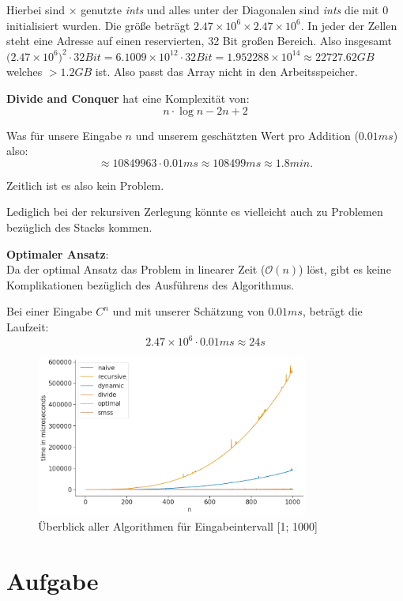 \documentclass[10pt]{article}
\begin{document}
    Hierbei sind $\times$ genutzte \textit{ints} und alles unter der Diagonalen sind \textit{ints} die mit 0 
    initialisiert wurden. Die grö\ss e beträgt $2.47 \times 10^{6} \times 2.47 \times 10^{6}$. In jeder der Zellen steht
    eine Adresse auf einen reservierten, 32 Bit gro\ss en Bereich.
    Also insgesamt $\big(2.47 \times 10^{6}\big)^{2} \cdot 32 Bit = 6.1009 \times 10^{12} \cdot 32 Bit = 1.952288 \times 10^{14} \approx 22727.62 GB$ 
    welches $> 1.2 GB$ ist. Also passt das Array nicht in den Arbeitsspeicher.
    

   \textbf{Divide and Conquer} hat eine Komplexität von:
   $$
        n \cdot \log n - 2 n + 2
   $$

   Was für unsere Eingabe $n$ und unserem geschätzten Wert pro Addition ($0.01ms$) also:
   \[
       \approx 10 849 963 \cdot 0.01ms \approx 108499ms \approx 1.8 min
   .\]

   Zeitlich ist es also kein Problem.

   Lediglich bei der rekursiven Zerlegung könnte es vielleicht auch zu Problemen bezüglich des Stacks kommen.

   \textbf{Optimaler Ansatz}:\\
   Da der optimal Ansatz das Problem in linearer Zeit ($\mathcal O (n)$) löst, gibt es keine 
   Komplikationen bezüglich des Ausführens des Algorithmus.

   Bei einer Eingabe $C^{n}$ und mit unserer Schätzung von $0.01ms$, beträgt die Laufzeit:
   \[
       2.47 \times 10^{6} \cdot 0.01ms \approx 24 s
   \]

\begin{figure}[h]
    \centering
    \includegraphics[width=0.8\textwidth]{../times_1000_all.png}
    \caption{Überblick aller Algorithmen für Eingabeintervall [1; 1000]}
    \label{fig:Ueberblick}
\end{figure}

\section{Aufgabe}
\end{document}
